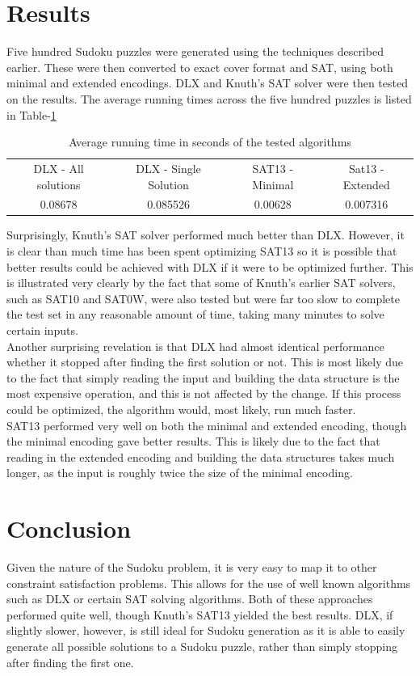 \documentclass[12pt]{article}
\begin{document}
\section{Results}
Five hundred Sudoku puzzles were generated using the techniques described earlier. These were then converted to exact cover format and SAT, using both minimal and extended encodings. DLX and Knuth's SAT solver were then tested on the results. The average running times across the five hundred puzzles is listed in Table-\ref{table:runningtime}

\begin{table}[H]
\begin{center}
\begin{tabular}{cccc}
DLX - All solutions & DLX - Single Solution & SAT13 - Minimal & Sat13 - Extended\\
0.08678 & 0.085526 & 0.00628 & 0.007316
\end{tabular}
\caption{Average running time in seconds of the tested algorithms}
\label{table:runningtime}
\end{center}
\end{table}

Surprisingly, Knuth's SAT solver performed much better than DLX. However, it is clear than much time has been spent optimizing SAT13 so it is possible that better results could be achieved with DLX if it were to be optimized further. This is illustrated very clearly by the fact that some of Knuth's earlier SAT solvers, such as SAT10 and SAT0W, were also tested but were far too slow to complete the test set in any reasonable amount of time, taking many minutes to solve certain inputs. \\

Another surprising revelation is that DLX had almost identical performance whether it stopped after finding the first solution or not. This is most likely due to the fact that simply reading the input and building the data structure is the most expensive operation, and this is not affected by the change. If this process could be optimized, the algorithm would, most likely, run much faster. \\

SAT13 performed very well on both the minimal and extended encoding, though the minimal encoding gave better results. This is likely due to the fact that reading in the extended encoding and building the data structures takes much longer, as the input is roughly twice the size of the minimal encoding. 
\section{Conclusion}
Given the nature of the Sudoku problem, it is very easy to map it to other constraint satisfaction problems. This allows for the use of well known algorithms such as DLX or certain SAT solving algorithms. Both of these approaches performed quite well, though Knuth's SAT13 yielded the best results. DLX, if slightly slower, however, is still ideal for Sudoku generation as it is able to easily generate all possible solutions to a Sudoku puzzle, rather than simply stopping after finding the first one.
\end{document}
